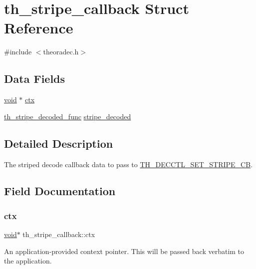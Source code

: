 \hypertarget{structth__stripe__callback}{}\section{th\+\_\+stripe\+\_\+callback Struct Reference}
\label{structth__stripe__callback}


{\ttfamily \#include $<$theoradec.\+h$>$}

\subsection*{Data Fields}
\begin{DoxyCompactItemize}
\item 
\hyperlink{png_8h_ac9c84fa68bbad002983e35ce3663c686}{void} $\ast$ \hyperlink{structth__stripe__callback_ab895162ce29a411fa98e0ba9661f47d4}{ctx}
\item 
\hyperlink{theoradec_8h_aac9c30f65672f8266d8370fc1ca55bca}{th\+\_\+stripe\+\_\+decoded\+\_\+func} \hyperlink{structth__stripe__callback_a977c725680a37e3446e459f063b1f4a5}{stripe\+\_\+decoded}
\end{DoxyCompactItemize}


\subsection{Detailed Description}
The striped decode callback data to pass to \hyperlink{theoradec_8h_ac95cc9e109474b0fa4bb920ab2cfdf1e}{T\+H\+\_\+\+D\+E\+C\+C\+T\+L\+\_\+\+S\+E\+T\+\_\+\+S\+T\+R\+I\+P\+E\+\_\+\+CB}. 

\subsection{Field Documentation}
\mbox{\label{structth__stripe__callback_ab895162ce29a411fa98e0ba9661f47d4}} 
\subsubsection{\texorpdfstring{ctx}{ctx}}
{\footnotesize\ttfamily \hyperlink{png_8h_ac9c84fa68bbad002983e35ce3663c686}{void}$\ast$ th\+\_\+stripe\+\_\+callback\+::ctx}

An application-\/provided context pointer. This will be passed back verbatim to the application. \mbox{\label{structth__stripe__callback_a977c725680a37e3446e459f063b1f4a5}} 
